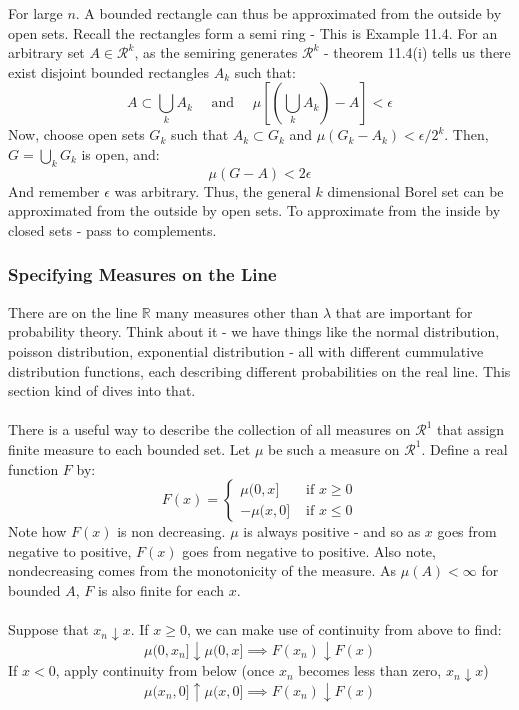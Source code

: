 \documentclass[12pt,a4paper]{article}
\newcommand{\1}[1]{\mathbbm{1}\left\{ #1 \right\}}
\newcommand{\R}{\mathbb{R}}
\newcommand{\rcal}{\mathcal{R}}
\begin{document}
For large $n$. A bounded rectangle can thus be approximated from the outside by open sets. Recall the rectangles form a semi ring - This is Example 11.4. For an arbitrary set $A \in \rcal^k$, as the semiring generates $\rcal^k$ - theorem 11.4(i) tells us there exist disjoint bounded rectangles $A_k$ such that:
$$
	A \subset \bigcup_k A_k \quad\text{ and }\quad
	\mu\left[\left(\bigcup_k A_k\right) - A\right] < \epsilon
$$
Now, choose open sets $G_k$ such that $A_k \subset G_k$ and $\mu(G_k - A_k) < \epsilon/2^k$. Then, $G = \bigcup_k G_k$ is open, and:
$$
	\mu(G - A) < 2\epsilon
$$
And remember $\epsilon$ was arbitrary. Thus, the general $k$ dimensional Borel set can be approximated from the outside by open sets. To approximate from the inside by closed sets - pass to complements.

\subsubsection{Specifying Measures on the Line} There are on the line $\R$ many measures other than $\lambda$ that are important for probability theory. Think about it - we have things like the normal distribution, poisson distribution, exponential distribution - all with different cummulative distribution functions, each describing different probabilities on the real line. This section kind of dives into that.
\\\\
There is a useful way to describe the collection of all measures on $\rcal^1$ that assign finite measure to each bounded set. Let $\mu$ be such a measure on $\rcal^1$. Define a real function $F$ by:
$$
	F(x) = \begin{cases}
	\mu(0,x] & \text{ if $x \geq 0$}\\
	-\mu(x,0] & \text{ if $x \leq 0$}
	\end{cases}
$$
Note how $F(x)$ is non decreasing. $\mu$ is always positive - and so as $x$ goes from negative to positive, $F(x)$ goes from negative to positive. Also note, nondecreasing comes from the monotonicity of the measure. As $\mu(A) < \infty$ for bounded $A$, $F$ is also finite for each $x$.
\\\\
Suppose that $x_n \downarrow x$. If $x \geq 0$, we can make use of continuity from above to find:
$$
	\mu(0,x_n] \downarrow \mu(0,x] \implies
	F(x_n) \downarrow F(x)
$$
If $x < 0$, apply continuity from below (once $x_n$ becomes less than zero, $x_n \downarrow x$)
$$
	\mu(x_n,0] \uparrow \mu(x,0] \implies
	F(x_n) \downarrow F(x)
$$
\end{document}
